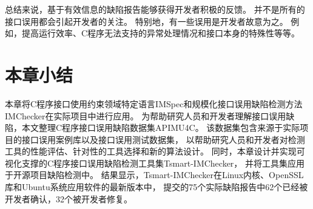总结来说，基于有效信息的缺陷报告能够获得开发者积极的反馈。
并不是所有的接口误用都会引起开发者的关注。
特别地，有一些误用是开发者故意为之。
例如，提高运行效率、C程序无法支持的异常处理情况和接口本身的特殊性等等。


\section{本章小结}
\label{sec:4.5}
本章将C程序接口使用约束领域特定语言IMSpec和规模化接口误用缺陷检测方法IMChecker在实际项目中进行应用。
为帮助研究人员和开发者理解接口误用缺陷，本文整理C程序接口误用缺陷数据集APIMU4C。
该数据集包含来源于实际项目的接口误用案例库以及接口误用测试数据集，
以帮助研究人员和开发者对检测工具的性能评估、针对性的工具选择和新的算法设计。
同时，本章设计并实现可视化支撑的C程序接口误用缺陷检测工具集Tsmart-IMChecker，
并将工具集应用于开源项目缺陷检测中。
结果显示，Tsmart-IMChecker在Linux内核、OpenSSL库和Ubuntu系统应用软件的最新版本中，
提交的75个实际缺陷报告中62个已经被开发者确认，32个被开发者修复。